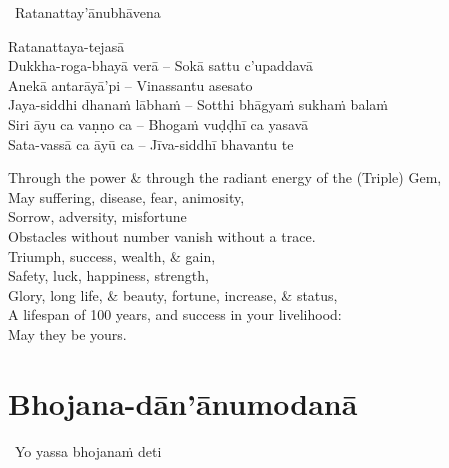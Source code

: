 \begin{pali-leader}
  \anglebracketleft\ \hspace{-0.5mm}Ratanattay'ānubhāvena \hspace{-0.5mm}\anglebracketright\
\end{pali-leader}
\begin{pali-hangtogether}
  Ratanattaya-tejasā\\
  Dukkha-roga-bhayā verā – Sokā sattu c'upaddavā\\
  Anekā antarāyā'pi – Vinassantu asesato\\
  Jaya-siddhi dhanaṁ lābhaṁ – Sotthi bhāgyaṁ sukhaṁ balaṁ\\
  Siri āyu ca vaṇṇo ca – Bhogaṁ vuḍḍhī ca yasavā\\
  Sata-vassā ca āyū ca – Jīva-siddhī bhavantu te
\end{pali-hangtogether}

\begin{english-verses}
  Through the power \& through the radiant energy of the (Triple) Gem,\\
  May suffering, disease, fear, animosity,\\
  Sorrow, adversity, misfortune\\
  Obstacles without number vanish without a trace.\\
  Triumph, success, wealth, \& gain,\\
  Safety, luck, happiness, strength,\\
  Glory, long life, \& beauty, fortune, increase, \& status,\\
  A lifespan of 100 years, and success in your livelihood:\\
  May they be yours.
\end{english-verses}

\suttaRef{[Thai]}

\section{Bhojana-dān'ānumodanā}
\label{bhojana-dananumodana}

\begin{leader-only}
  \anglebracketleft\ \hspace{-0.5mm}Yo yassa bhojanaṁ deti \hspace{-0.5mm}\anglebracketright\
\end{leader-only}

\vspace{-0.99em}

